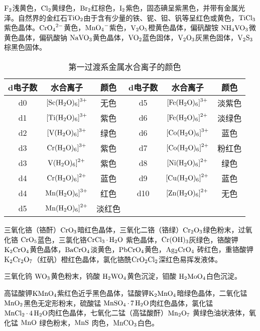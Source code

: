 \documentclass[
  10pt,
  twoside,
  openany,
  b5paper, %
  colorscheme = basic, %
  xits = false,
]{qyxf-book}
\begin{document}
$\ce{F2}$浅黄色，$\ce{Cl2}$黄绿色，$\ce{Br2}$红棕色，$\ce{I2}$紫色，固态碘呈紫黑色，并带有金属光泽。自然界的金红石$\ce{TiO2}$由于含有少量的铁、铌、钽、钒等呈红色或黄色，$\ce{TiCl3}$紫色晶体。$\ce{CrO4^2-}$黄色，$\ce{MnO4-}$紫色，$\ce{V2O5}$橙黄色晶体，偏矾酸铵 $\ce{NH4VO3}$微黄色晶体，偏矾酸钠 $\ce{NaVO3}$黄色晶体，$\ce{VO2}$蓝色固体，$\ce{V2O3}$灰黑色固体，$\ce{V2S3}$棕黑色固体。

\begin{table}[htbp]
	\centering
	\caption{第一过渡系金属水合离子的颜色}
	\begin{tabular}{|c|c|c||c|c|c|}
		\hline
		d电子数 & 水合离子 & 颜色 & d电子数 & 水合离子 & 颜色  \\ \hline
		d0 & $\ce{[Sc(H2O)6]^3+}$ & 无色 & d5 & $\ce{[Fe(H2O)6]^3+}$ & 淡紫色  \\ \hline
		d1 & $\ce{[Ti(H2O)6]^3+}$ & 紫色 & d6 & $\ce{[Fe(H2O)6]^2+}$ & 淡绿色  \\ \hline
		d2 & $\ce{[V(H2O)6]^3+}$ & 绿色 & d6 & $\ce{[Co(H2O)6]^3+}$ & 蓝色  \\ \hline
		d3 & $\ce{Cr(H2O)6]^3+}$ & 紫色 & d7 & $\ce{[Co(H2O)6]^2+}$ & 粉红色  \\ \hline
		d3 & $\ce{V(H2O)6]^2+}$ & 紫色 & d8 & $\ce{[Ni(H2O)6]^2+}$ & 绿色  \\ \hline
		d4 & $\ce{Cr(H2O)6]^2+}$ & 蓝色 & d9 & $\ce{[Cu(H2O)6]^2+}$ & 蓝色  \\ \hline
		d4 & $\ce{Mn(H2O)6]^3+}$ & 红色 & d10 & $\ce{[Zn(H2O)6]^2+}$ & 无色  \\ \hline
		d5 & $\ce{Mn(H2O)6]^2+}$ & 淡红色 &  &  &   \\ \hline
	\end{tabular}
\end{table}

三氧化铬（铬酐）$\ce{CrO3}$暗红色晶体，三氧化二铬（铬绿）$\ce{Cr2O3}$绿色粉末，过氧化铬 $\ce{CrO5}$蓝色，三氯化铬$\ce{CrCl3*H2O}$ 紫色晶体，$\ce{Cr(OH)3}$灰绿色，铬酸钾 $\ce{K2CrO4}$黄色晶体，$\ce{BaCrO4}$淡黄色，$\ce{PbCrO4}$黄色，$\ce{Ag2CrO4}$
砖红色，重铬酸钾 $\ce{K2Cr2O7}$（红矾）橙红色晶体，氯化铬酰$ \ce{CrO2Cl2}$深红色易挥发液体。

三氧化钨 $\ce{WO3}$黄色粉末，钨酸 $\ce{H2WO4}$黄色沉淀，钼酸 $\ce{H2MoO4} $白色沉淀。

高锰酸钾$ \ce{KMnO4}$紫红色近乎黑色晶体，锰酸钾$ \ce{K2MnO4}$暗绿色晶体，二氧化锰 $\ce{MnO2}$黑色无定形粉末，硫酸锰 $\ce{MnSO4*7H2O }$肉红色晶体，氯化锰 $\ce{MnCl2*4H2O} $肉红色晶体，七氧化二锰（高锰酸酐）$\ce{Mn2O7}$
黄绿色油状液体，氧化锰 $\ce{MnO}$ 绿色粉末，$\ce{MnS}$ 肉色，$\ce{MnCO3}$白色。
\end{document}
